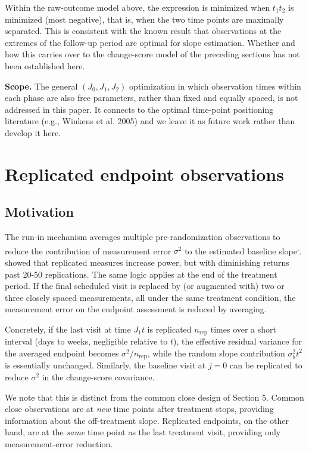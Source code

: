 \documentclass[
  11pt,
]{article}
\begin{document}
Within the raw-outcome model above, the expression is
minimized when \(t_1 t_2\) is minimized (most negative),
that is, when the two time points are maximally
separated. This is consistent with the known result that
observations at the extremes of the follow-up period are
optimal for slope estimation. Whether and how this
carries over to the change-score model of the preceding
sections has not been established here.

\textbf{Scope.} The general \((J_0, J_1, J_2)\) optimization in
which observation times within each phase are also free
parameters, rather than fixed and equally spaced, is not
addressed in this paper. It connects to the optimal
time-point positioning literature (e.g., Winkens et al.
2005) and we leave it as future work rather than develop
it here.

\section{Replicated endpoint observations}\label{replicated-endpoint-observations}

\subsection{Motivation}\label{motivation}

The run-in mechanism averages multiple pre-randomization
observations to reduce the contribution of measurement
error \(\sigma^2\) to the estimated baseline slope\textsuperscript{,}.\textsuperscript{} showed that
replicated measures increase power, but with diminishing
returns past 20-50 replications. The same logic applies
at the end of the treatment period. If the final
scheduled visit is replaced by (or augmented with) two or
three closely spaced measurements, all under the same
treatment condition, the measurement error on the
endpoint assessment is reduced by averaging.

Concretely, if the last visit at time \(J_1 t\) is
replicated \(n_{\text{rep}}\) times over a short interval
(days to weeks, negligible relative to \(t\)), the
effective residual variance for the averaged endpoint
becomes \(\sigma^2 / n_{\text{rep}}\), while the random
slope contribution \(\sigma_b^2 t^2\) is essentially
unchanged. Similarly, the baseline visit at \(j = 0\) can
be replicated to reduce \(\sigma^2\) in the change-score
covariance.

We note that this is distinct from the common close
design of Section 5. Common close observations are at
\emph{new} time points after treatment stops, providing
information about the off-treatment slope. Replicated
endpoints, on the other hand, are at the \emph{same} time
point as the last treatment visit, providing only
measurement-error reduction.
\end{document}
